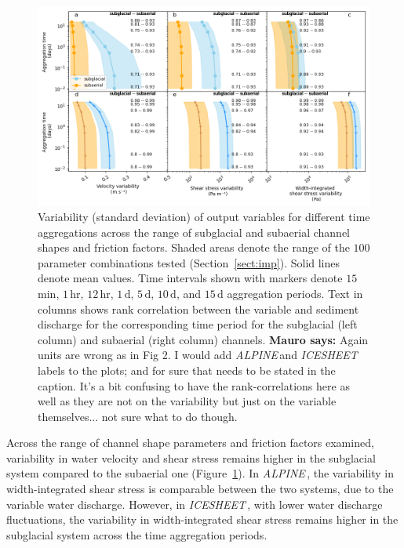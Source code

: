 \documentclass[draft]{agujournal2019}
\newcommand{\mauro}[1]{{\textbf{\color{green}Mauro says:} \color{green} #1} }
\newcommand{\alpine}{\textit{ALPINE}\,}
\newcommand{\icesheet}{\textit{ICESHEET}\,}
\newcommand{\unit}[1]{$\mathrm{#1}$}
\begin{document}
\begin{figure}[h]
  \centering
    \includegraphics[width=0.9\linewidth]{Fig4.png}
    \caption{Variability (standard deviation) of output variables for different time aggregations across the range of subglacial and subaerial channel shapes and friction factors.
      Shaded areas denote the range of the $100$ parameter combinations tested (Section~\ref{sect:imp}).
      Solid lines denote  mean values.
      Time intervals shown with markers denote $15$\,\unit{min}, $1$\,\unit{hr}, $12$\,\unit{hr}, $1$\,\unit{d}, $5$\,\unit{d}, $10$\,\unit{d}, and $15$\,\unit{d} aggregation periods.
      Text in columns shows rank correlation between the variable and sediment discharge for the corresponding time period for the subglacial (left column) and subaerial (right column) channels.
      \mauro{Again units are wrong as in Fig 2.
        I would add \alpine and \icesheet labels to the plots; and for sure that needs to be stated in the caption.
        It's a bit confusing to have the rank-correlations here as well as they are not on the variability but just on the variable themselves... not sure what to do though. } }
    \label{fig:multi_run}
  \end{figure}

Across the range of channel shape parameters and friction factors  examined, variability in water velocity and shear stress remains higher in the subglacial system compared to the subaerial one (Figure~\ref{fig:multi_run}).
In \alpine{}, the variability in width-integrated shear stress is comparable between the two systems, due to the variable water discharge.
However, in \icesheet{}, with lower water discharge fluctuations, the variability in width-integrated shear stress remains higher in the subglacial system across the time aggregation periods.
\end{document}
